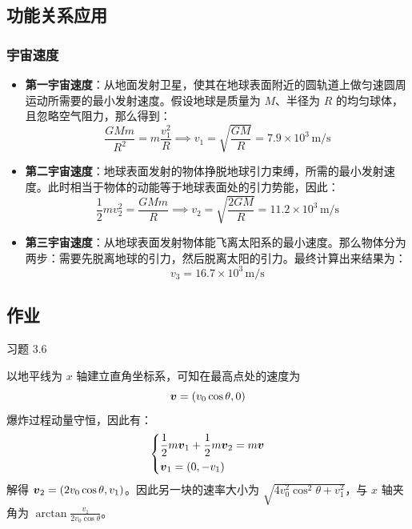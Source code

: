\subsection{功能关系应用}

\subsubsection{宇宙速度}

\begin{itemize}
    \item \textbf{第一宇宙速度}：从地面发射卫星，使其在地球表面附近的圆轨道上做匀速圆周运动所需要的最小发射速度。假设地球是质量为 $M$、半径为 $R$ 的均匀球体，且忽略空气阻力，那么得到：
    $$
    \frac{G M m}{R^2} = m \frac{v_1^2}{R} \implies v_1 = \sqrt{\frac{G M}{R}} = 7.9 \times 10^3\,\mathrm{m / s}
    $$

    \item \textbf{第二宇宙速度}：地球表面发射的物体挣脱地球引力束缚，所需的最小发射速度。此时相当于物体的动能等于地球表面处的引力势能，因此：
    $$
    \frac{1}{2} m v_2^2 = \frac{G M m}{R} \implies v_2 = \sqrt{\frac{2 G M}{R}} = 11.2 \times 10^3\,\mathrm{m / s}
    $$

    \item \textbf{第三宇宙速度}：从地球表面发射物体能飞离太阳系的最小速度。那么物体分为两步：需要先脱离地球的引力，然后脱离太阳的引力。最终计算出来结果为：
    $$
    v_3 = 16.7 \times 10^3 \,\mathrm{m / s}
    $$
\end{itemize}

\subsection{作业}

\begin{problem}
    习题 3.6
    \begin{solution}
        以地平线为 $x$ 轴建立直角坐标系，可知在最高点处的速度为
        $$
        \boldsymbol{v} = (v_0 \cos \theta, 0)
        $$
        爆炸过程动量守恒，因此有：
        $$
        \begin{dcases}
            \frac{1}{2} m \boldsymbol{v}_1 + \frac{1}{2} m \boldsymbol{v}_2 = m \boldsymbol{v} \\
            \boldsymbol{v}_1 = (0, -v_1)
        \end{dcases}
        $$
        解得 $\boldsymbol{v}_2 = (2 v_0 \cos \theta, v_1)$。因此另一块的速率大小为 $\sqrt{4 v_0^2 \cos^2 \theta + v_1^2}$，与 $x$ 轴夹角为 $\arctan \frac{v_1}{2 v_0 \cos \theta}$。
    \end{solution}
\end{problem}

